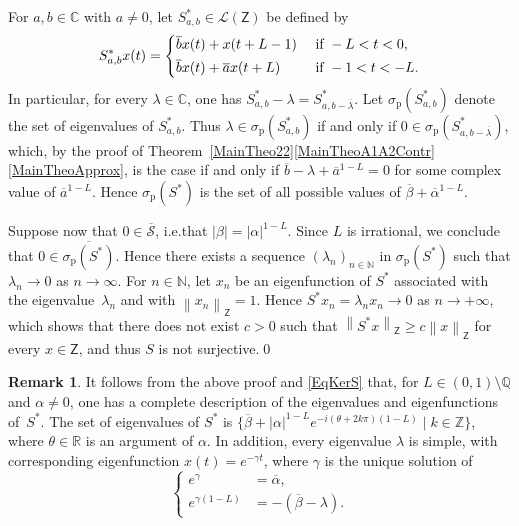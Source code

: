 \documentclass[10pt]{amsart}
\theoremstyle{plain}
\theoremstyle{definition}
\newtheorem{remk}[theo]{Remark}
\newcommand{\norm}[1]{\left\lVert #1\right\lVert}
\newcommand{\abs}[1]{\left\lvert #1\right \rvert}
\providecommand{\ie}{i.e.}\providecommand{\etc}{etc.}\providecommand{\resp}{resp.}\providecommand{\cf}{cf.}
\begin{document}
For $a, b \in \mathbb C$ with $a \neq 0$, let $S_{a, b}^\ast \in \mathcal L(\mathsf Z)$ be defined by
\[
S_{a, b}^\ast x(t) =
\begin{dcases}
\overline b x(t) + x(t + L - 1) & \text{ if } -L < t < 0, \\
\overline b x(t) + \overline a x(t + L) & \text{ if } -1 < t < -L.
\end{dcases}
\]
In particular, for every $\lambda \in \mathbb C$, one has $S_{a, b}^\ast - \lambda = S_{a, b - \overline\lambda}^\ast$. Let $\sigma_{\mathrm p}(S_{a, b}^\ast)$ denote the set of eigenvalues of $S_{a, b}^\ast$. Thus $\lambda \in \sigma_{\mathrm p}(S_{a, b}^\ast)$ if and only if $0 \in \sigma_{\mathrm p}(S_{a, b - \overline\lambda}^\ast)$, which, by the proof of Theorem~\ref{MainTheo22}\eqref{MainTheoA1A2Contr}\eqref{MainTheoApprox}, is the case if and only if $\overline b - \lambda + \overline a^{1-L} = 0$ for some complex value of $\overline a^{1-L}$. Hence $\sigma_{\mathrm p}(S^\ast)$ is the set of all possible values of $\overline\beta + \overline\alpha^{1-L}$.

Suppose now that $0 \in \overline{\mathcal S}$, \ie that $\abs{\beta} = \abs{\alpha}^{1-L}$. Since $L$ is irrational, we conclude that $0 \in \overline{\sigma_{\mathrm p}(S^\ast)}$. Hence there exists a sequence $(\lambda_n)_{n \in \mathbb N}$ in $\sigma_{\mathrm p}(S^\ast)$ such that $\lambda_n \to 0$ as $n \to \infty$. For $n \in \mathbb N$, let $x_n$ be an eigenfunction of $S^\ast$ associated with the eigenvalue~$\lambda_n$ and with $\norm{x_n}_{\mathsf Z} = 1$. Hence $S^\ast x_n = \lambda_n x_n \to 0$ as $n \to +\infty$, which shows that there does not exist $c > 0$ such that $\norm{S^\ast x}_{\mathsf Z} \geq c \norm{x}_{\mathsf Z}$ for every $x \in \mathsf Z$, and thus $S$ is not surjective.\qed

\begin{remk}
\label{RemkEigenpairsS}
It follows from the above proof and \eqref{EqKerS} that, for $L \in (0, 1) \setminus \mathbb Q$ and $\alpha \neq 0$, one has a complete description of the eigenvalues and eigenfunctions of~$S^\ast$. The set of eigenvalues of $S^\ast$ is $\{\overline\beta + \abs{\alpha}^{1 - L} e^{- i (\theta + 2 k \pi)(1 - L)} \mid k \in \mathbb Z\}$, where $\theta \in \mathbb R$ is an argument of $\alpha$. In addition, every eigenvalue $\lambda$ is simple, with corresponding eigenfunction $x(t) = e^{- \gamma t}$, where $\gamma$ is the unique solution of
\[
\left\{
\begin{aligned}
e^{\gamma} & = \overline\alpha, \\
e^{\gamma(1 - L)} & = - (\overline\beta - \lambda).
\end{aligned}
\right.
\]
\end{remk}
\end{document}
